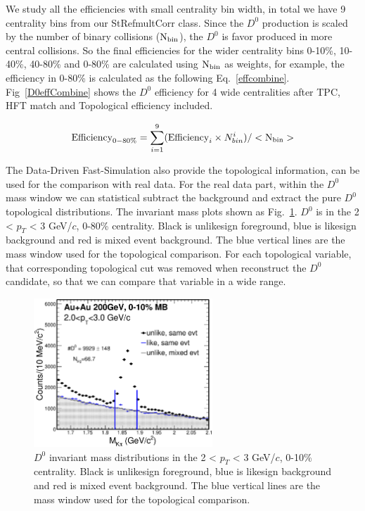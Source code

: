 We study all the efficiencies with small centrality bin width, in total we have 9 centrality bins from our StRefmultCorr class. Since the $D^0$ production is scaled by the number of binary collisions ($\textup{N}_{\textup{bin}}$), the $D^0$ is favor produced in more central collisions. So the final efficiencies for the wider centrality bins 0-10\%, 10-40\%, 40-80\% and 0-80\% are calculated using $\textup{N}_{\textup{bin}}$ as weights, for example, the efficiency in 0-80\% is calculated as the following Eq.~\ref{effcombine}. Fig~\ref{D0effCombine} shows the $D^0$ efficiency for 4 wide centralities after TPC, HFT match and Topological efficiency included.

\begin{equation}
  \textup{Efficiency}_{0-80\%} = \sum_{i=1}^{9}(\textup{Efficiency}_{i} \times N_{bin}^{i}) / <\textup{N}_{\textup{bin}}>
\label{effcombine}
\end{equation}

The Data-Driven Fast-Simulation also provide the topological information, can be used for the comparison with real data. For the real data part, within the $D^0$ mass window we can statistical subtract the background and extract the pure $D^0$ topological distributions. The invariant mass plots shown as Fig.~\ref{d0massforTopo}. $D^0$ is in the 2 < $p_T$ < 3 GeV/$c$, 0-80\% centrality. Black is unlikesign foreground, blue is likesign background and red is mixed event background. The blue vertical lines are the mass window used for the topological comparison. For each topological variable, that corresponding topological cut was removed when reconstruct the $D^0$ candidate, so that we can compare that variable in a wide range.

\begin{figure}[htbp]
\centering
\includegraphics[keepaspectratio,width=0.6\textwidth]{figure/Run14_D0HFT/Mixed_cent_8_9_pt_2_3.eps}
\caption{$D^0$ invariant mass distributions in the 2 < $p_T$ < 3 GeV/$c$, 0-10\% centrality. Black is unlikesign foreground, blue is likesign background and red is mixed event background. The blue vertical lines are the mass window used for the topological comparison.}
\label{d0massforTopo}
\end{figure}

